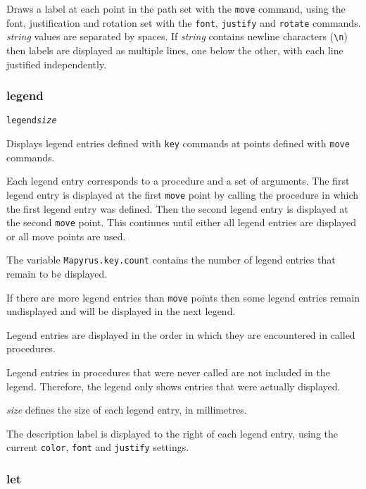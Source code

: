 Draws a label at each point in the path set with the \texttt{move} command,
using the font, justification and rotation set with the \texttt{font},
\texttt{justify} and \texttt{rotate} commands.  \textit{string} values are
separated by spaces.  If \textit{string} contains newline characters
(\texttt{\textbackslash{}n}) then labels are displayed as multiple lines, one
below the other, with each line justified independently.

\subsubsection{legend}

\begin{alltt}
legend \textit{size}
\end{alltt}

Displays legend entries defined with
\texttt{key} commands at points defined with
\texttt{move} commands.

Each legend entry corresponds to a procedure and a set of arguments.  The first
legend entry is displayed at the first \texttt{move} point by calling the
procedure in which the first legend entry was defined.  Then the second legend
entry is displayed at the second \texttt{move} point.  This continues until
either all legend entries are displayed or all move points are used.

The variable
\texttt{Mapyrus.key.count}
contains the number of legend entries that remain to be displayed.

If there are more legend entries than 
\texttt{move} points then some legend entries
remain undisplayed and will be displayed in the next legend.

Legend entries are displayed in the order in which they
are encountered in called procedures.

Legend entries in procedures that were never called are
not included in the legend.  Therefore, the legend only shows
entries that were actually displayed.

\textit{size} defines the size of each legend entry, in millimetres.

The description label is displayed to the right of each legend entry, using the
current \texttt{color}, \texttt{font} and \texttt{justify} settings.

\subsubsection{let}

